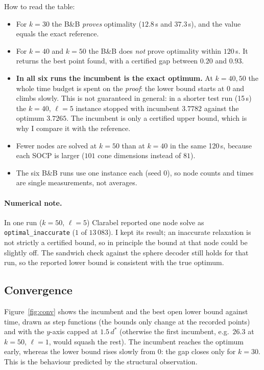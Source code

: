 \documentclass[11pt,a4paper]{article}
\newcommand{\BB}{B\&B}
\begin{document}
How to read the table:
\begin{itemize}
  \item For $k=30$ the \BB{} \emph{proves} optimality ($12.8$\,s and $37.3$\,s), and the value equals the exact reference.
  \item For $k=40$ and $k=50$ the \BB{} does \emph{not} prove optimality within $120$\,s. It returns the best point found, with a certified gap between $0.20$ and $0.93$.
  \item \textbf{In all six runs the incumbent is the exact optimum.} At $k=40,50$ the whole time budget is spent on the \emph{proof}: the lower bound starts at $0$ and climbs slowly. This is not guaranteed in general: in a shorter test run (15\,s) the $k=40$, $\ell=5$ instance stopped with incumbent $3.7782$ against the optimum $3.7265$. The incumbent is only a certified upper bound, which is why I compare it with the reference.
  \item Fewer nodes are solved at $k=50$ than at $k=40$ in the same 120\,s, because each SOCP is larger ($101$ cone dimensions instead of $81$).
  \item The six \BB{} runs use one instance each (seed $0$), so node counts and times are single measurements, not averages.
\end{itemize}

\paragraph{Numerical note.} In one run ($k=50$, $\ell=5$) Clarabel reported one node solve as \texttt{optimal\_inaccurate} ($1$ of $13\,083$). I kept its result; an inaccurate relaxation is not strictly a certified bound, so in principle the bound at that node could be slightly off. The sandwich check against the sphere decoder still holds for that run, so the reported lower bound is consistent with the true optimum.

\subsection{Convergence}

Figure~\ref{fig:conv} shows the incumbent and the best open lower bound against time, drawn as step functions (the bounds only change at the recorded points) and with the $y$-axis capped at $1.5\,d^\ast$ (otherwise the first incumbent, e.g.\ $26.3$ at $k=50$, $\ell=1$, would squash the rest). The incumbent reaches the optimum early, whereas the lower bound rises slowly from $0$: the gap closes only for $k=30$. This is the behaviour predicted by the structural observation.
\end{document}
